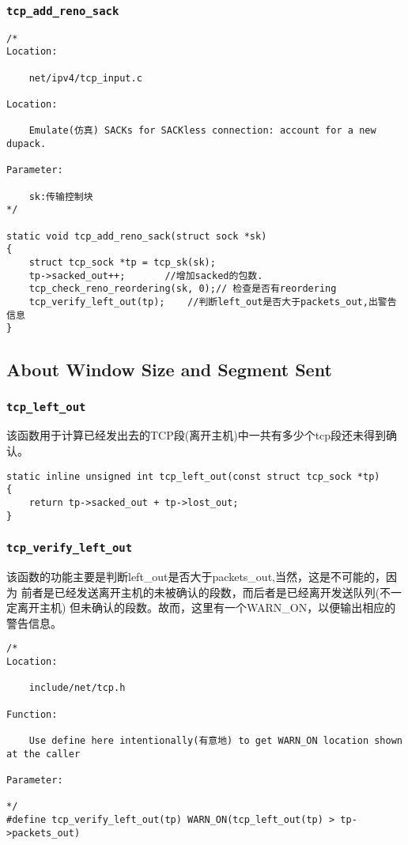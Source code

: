 		\subsubsection{\texttt{tcp_add_reno_sack}}
\begin{verbatim}
/* 
Location:

	net/ipv4/tcp_input.c

Location:

	Emulate(仿真) SACKs for SACKless connection: account for a new dupack.

Parameter:

	sk:传输控制块
*/

static void tcp_add_reno_sack(struct sock *sk)
{
	struct tcp_sock *tp = tcp_sk(sk);
	tp->sacked_out++;		//增加sacked的包数.
	tcp_check_reno_reordering(sk, 0);// 检查是否有reordering
	tcp_verify_left_out(tp);	//判断left_out是否大于packets_out,出警告信息
}
\end{verbatim}
	\subsection{About Window Size and Segment Sent}
		
		\subsubsection{\texttt{tcp_left_out}}
			该函数用于计算已经发出去的TCP段(离开主机)中一共有多少个tcp段还未得到确认。
\begin{verbatim}
static inline unsigned int tcp_left_out(const struct tcp_sock *tp)
{
	return tp->sacked_out + tp->lost_out;
}
\end{verbatim}
		\subsubsection{\texttt{tcp_verify_left_out}}
			该函数的功能主要是判断left\_out是否大于packets\_out,当然，这是不可能的，因为
			前者是已经发送离开主机的未被确认的段数，而后者是已经离开发送队列(不一定离开主机)
			但未确认的段数。故而，这里有一个WARN\_ON，以便输出相应的警告信息。
\begin{verbatim}
/* 
Location:

	include/net/tcp.h

Function:

	Use define here intentionally(有意地) to get WARN_ON location shown at the caller 

Parameter:

*/
#define tcp_verify_left_out(tp)	WARN_ON(tcp_left_out(tp) > tp->packets_out)		
\end{verbatim}
